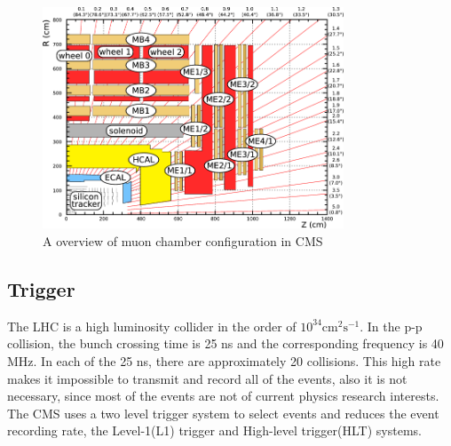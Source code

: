\begin{figure}[htbp] 
\centering
\includegraphics[width=0.8\textwidth]{chapter3/Muon_chambers.png}
\caption{A overview of muon chamber configuration in CMS~\cite{Muon_chambers}}
\label{fig:muon_sketch}
\end{figure}


\subsection{Trigger}

The LHC is a high luminosity collider in the order of $10^{34}\textrm{cm}^{2}\textrm{s}^{-1}$. In the p-p collision, the bunch crossing time is 25 ns and the corresponding frequency is 40 MHz. In each of the 25 ns, there are approximately 20 collisions. This high rate makes it impossible to transmit and record all of the events, also it is not necessary, since most of the events are not of current physics research interests. The CMS uses a two level trigger system to select events and reduces the event recording rate, the Level-1(L1) trigger and High-level trigger(HLT) systems. 


